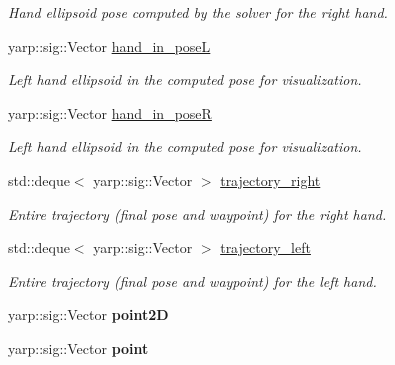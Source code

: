\begin{DoxyCompactItemize}
\begin{DoxyCompactList}\small\item\em Hand ellipsoid pose computed by the solver for the right hand. \end{DoxyCompactList}\item 
yarp\+::sig\+::\+Vector \hyperlink{classGraspVisualization_a25591f12c24270bc2257eb2a5446e85d}{hand\+\_\+in\+\_\+poseL}\label{classGraspVisualization_a25591f12c24270bc2257eb2a5446e85d}

\begin{DoxyCompactList}\small\item\em Left hand ellipsoid in the computed pose for visualization. \end{DoxyCompactList}\item 
yarp\+::sig\+::\+Vector \hyperlink{classGraspVisualization_ae4f26a3c1c3c4b51ac043bdfb1176092}{hand\+\_\+in\+\_\+poseR}\label{classGraspVisualization_ae4f26a3c1c3c4b51ac043bdfb1176092}

\begin{DoxyCompactList}\small\item\em Left hand ellipsoid in the computed pose for visualization. \end{DoxyCompactList}\item 
std\+::deque$<$ yarp\+::sig\+::\+Vector $>$ \hyperlink{classGraspVisualization_af2ad3c4bb204694b6948fa99d508282f}{trajectory\+\_\+right}\label{classGraspVisualization_af2ad3c4bb204694b6948fa99d508282f}

\begin{DoxyCompactList}\small\item\em Entire trajectory (final pose and waypoint) for the right hand. \end{DoxyCompactList}\item 
std\+::deque$<$ yarp\+::sig\+::\+Vector $>$ \hyperlink{classGraspVisualization_a8d400d538af6c649485081f306d43e3e}{trajectory\+\_\+left}\label{classGraspVisualization_a8d400d538af6c649485081f306d43e3e}

\begin{DoxyCompactList}\small\item\em Entire trajectory (final pose and waypoint) for the left hand. \end{DoxyCompactList}\item 
yarp\+::sig\+::\+Vector {\bfseries point2D}\label{classGraspVisualization_ad377be64896271582eb9f5257ecef819}

\item 
yarp\+::sig\+::\+Vector {\bfseries point}\label{classGraspVisualization_ae8cf3097e9a8542ba3562fdfc8837995}


\end{DoxyCompactItemize}

